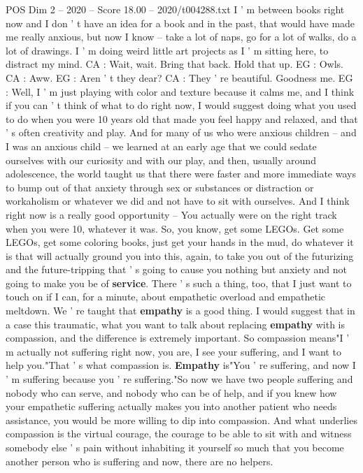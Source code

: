 \begin{textsample}{POS Dim 2 – 2020 – Score 18.00 – 2020/t004288.txt}
I ' m between books right now and I don ' t have an idea for a book and in the past, that would have made me really anxious, but now I know -- take a lot of naps, go for a lot of walks, do a lot of drawings.
I ' m doing weird little art projects as I ' m sitting here, to distract my mind.
CA : Wait, wait.
Bring that back.
Hold that up.
EG : Owls.
CA : Aww.
EG : Aren ' t they dear?
CA : They ' re beautiful.
Goodness me.
EG : Well, I ' m just playing with color and texture because it calms me, and I think if you can ' t think of what to do right now, I would suggest doing what you used to do when you were 10 years old that made you feel happy and relaxed, and that ' s often creativity and play.
And for many of us who were anxious children -- and I was an anxious child -- we learned at an early age that we could sedate ourselves with our curiosity and with our play, and then, usually around adolescence, the world taught us that there were faster and more immediate ways to bump out of that anxiety through sex or substances or distraction or workaholism or whatever we did and not have to sit with ourselves.
And I think right now is a really good opportunity -- You actually were on the right track when you were 10, whatever it was.
So, you know, get some LEGOs.
Get some LEGOs, get some coloring books, just get your hands in the mud, do whatever it is that will actually ground you into this, again, to take you out of the futurizing and the future-tripping that ' s going to cause you nothing but anxiety and not going to make you be of \textbf{service}.
There ' s such a thing, too, that I just want to touch on if I can, for a minute, about empathetic overload and empathetic meltdown.
We ' re taught that \textbf{empathy} is a good thing.
I would suggest that in a case this traumatic, what you want to talk about replacing \textbf{empathy} with is compassion, and the difference is extremely important.
So compassion means"I ' m actually not suffering right now, you are, I see your suffering, and I want to help you."That ' s what compassion is. \textbf{Empathy} is"You ' re suffering, and now I ' m suffering because you ' re suffering."So now we have two people suffering and nobody who can serve, and nobody who can be of help, and if you knew how your empathetic suffering actually makes you into another patient who needs assistance, you would be more willing to dip into compassion.
And what underlies compassion is the virtual courage, the courage to be able to sit with and witness somebody else ' s pain without inhabiting it yourself so much that you become another person who is suffering and now, there are no helpers.

\end{textsample}
